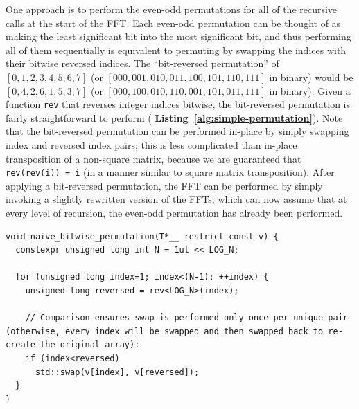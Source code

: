 \documentclass[10pt]{article}
\begin{document}
One approach is to perform the even-odd permutations for all of the
recursive calls at the start of the FFT. Each even-odd permutation can
be thought of as making the least significant bit into the most
significant bit, and thus performing all of them sequentially is
equivalent to permuting by swapping the indices with their bitwise
reversed indices. The ``bit-reversed permutation'' of $[0, 1, 2, 3, 4,
  5, 6, 7]$ (or $[000, 001, 010, 011, 100, 101, 110, 111]$ in binary)
would be $[0, 4, 2, 6, 1, 5, 3, 7]$ (or $[000, 100, 010, 110, 001,
  101, 011, 111]$ in binary). Given a function {\tt rev} that reverses
integer indices bitwise, the bit-reversed permutation is fairly
straightforward to perform ({\bf
  Listing~\ref{alg:simple-permutation}}). Note that the bit-reversed
permutation can be performed in-place by simply swapping index and
reversed index pairs; this is less complicated than in-place
transposition of a non-square matrix, because we are guaranteed that
{\tt rev(rev(i)) = i} (in a manner similar to square matrix
transposition). After applying a bit-reversed permutation, the FFT can
be performed by simply invoking a slightly rewritten version of the
FFTs, which can now assume that at every level of recursion, the
even-odd permutation has already been performed.

\begin{footnotesize}
\begin{lstlisting}[label={alg:simple-permutation},caption={{\bf Performing the bit-reversed permutation with the help of an external {\tt rev} function.} Let {\tt LOG\_N} be the problem size, which is a {\tt constexpr} (\emph{i.e.}, it is known a constant known at compile time). Note that the function {\tt rev} is templated to take the word size used for reversal.}]
void naive_bitwise_permutation(T*__ restrict const v) {
  constexpr unsigned long int N = 1ul << LOG_N;

  for (unsigned long index=1; index<(N-1); ++index) {
    unsigned long reversed = rev<LOG_N>(index);

    // Comparison ensures swap is performed only once per unique pair (otherwise, every index will be swapped and then swapped back to re-create the original array):
    if (index<reversed)
      std::swap(v[index], v[reversed]);
  }
}
\end{lstlisting}
\end{footnotesize}
\end{document}
